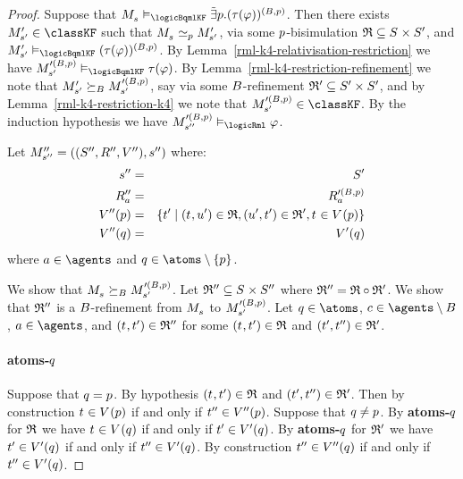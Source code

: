 \begin{proof}
Suppose that $\kPModel{\kStateS} \entails_\logicBqmlKF \somebisimsP (\tau(\phi))^{(\agentsB, \atomP)}$.
Then there exists $\kPModelP{\kStateSP} \in \classKF$ such that $\kPModel{\kStateS} \bisimilar[\atomP] \kPModelP{\kStateSP}$, via some $\atomP$-bisimulation $\bisimulation \subseteq \kStates \times \kStatesP$, and $\kPModelP{\kStateSP} \entails_\logicBqmlKF (\tau(\phi))^{(\agentsB, \atomP)}$.
By Lemma~\ref{rml-k4-relativisation-restriction} we have $\kPModel[\prime(\agentsB, \atomP)]{\kStateSP} \entails_\logicBqmlKF \tau(\phi)$.
By Lemma~\ref{rml-k4-restriction-refinement} we note that $\kPModelP{\kStateSP} \simulatesBs \kPModel[\prime(\agentsB, \atomP)]{\kStateSP}$, say via some $\agentsB$-refinement $\refinement' \subseteq \kStatesP \times \kStatesP$, and by Lemma~\ref{rml-k4-restriction-k4} we note that $\kPModel[\prime(\agentsB, \atomP)]{\kStateSP} \in \classKF$.
By the induction hypothesis we have $\kPModel[\prime(\agentsB, \atomP)]{\kStateSPP} \entails_\logicRml \phi$.

Let $\kPModelAndTuplePP{\kStateSPP}$ where:
\begin{eqnarray*}
    \kStateSPP &=& \kStatesP\\
    \kAccessibilityPPA &=& \kAccessibilityA[\prime(\agentsB, \atomP)]\\
    \kValuationPP(\atomP) &=& \{\kStateTP \mid (\kStateT, \kStateUP) \in \bisimulation, (\kStateUP, \kStateTP) \in \refinement', \kStateT \in \kValuation(\atomP)\}\\
    \kValuationPP(\atomQ) &=& \kValuationP(\atomQ)\\
\end{eqnarray*}
where $\agentA \in \agents$ and $\atomQ \in \atoms \setminus \{\atomP\}$.

We show that $\kPModel{\kStateS} \simulatesBs \kPModel[\prime(\agentsB, \atomP)]{\kStateSP}$.
Let $\refinement'' \subseteq \kStates \times \kStatesPP$ where $\refinement'' = \bisimulation \circ \refinement'$.
We show that $\refinement''$ is a $\agentsB$-refinement from $\kPModel{\kStateS}$ to $\kPModel[\prime(\agentsB, \atomP)]{\kStateSP}$.
Let $\atomQ \in \atoms$, $\agentC \in \agents \setminus \agentsB$, $\agentA \in \agents$, and $(\kStateT, \kStateTP) \in \refinement''$ for some $(\kStateT, \kStateTP) \in \bisimulation$ and $(\kStateTP, \kStateTPP) \in \refinement'$.

\paragraph{atoms-$\atomQ$}
Suppose that $\atomQ = \atomP$.
By hypothesis $(\kStateT, \kStateTP) \in \bisimulation$ and $(\kStateTP, \kStateTPP) \in \refinement'$.
Then by construction $\kStateT \in \kValuation(\atomP)$ if and only if $\kStateTPP \in \kValuationPP(\atomP)$.
Suppose that $\atomQ \neq \atomP$.
By {\bf atoms-$\atomQ$} for $\bisimulation$ we have $\kStateT \in \kValuation(\atomQ)$ if and only if $\kStateTP \in \kValuationP(\atomQ)$.
By {\bf atoms-$\atomQ$} for $\refinement'$ we have $\kStateTP \in \kValuationP(\atomQ)$ if and only if $\kStateTPP \in \kValuationP(\atomQ)$.
By construction $\kStateTPP \in \kValuationPP(\atomQ)$ if and only if $\kStateTPP \in \kValuationP(\atomQ)$.


\end{proof}
